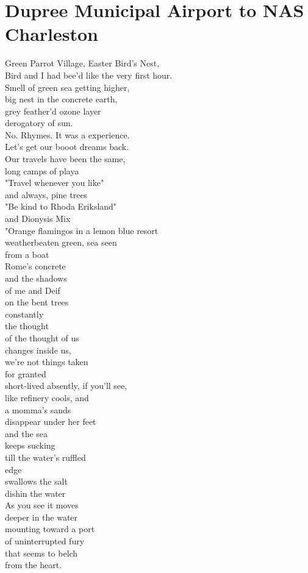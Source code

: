 \documentclass[smalldemyvopaper,11pt,twoside,onecolumn,openright,extrafontsizes]{memoir}
\begin{document}
\chapter{Dupree Municipal Airport to NAS Charleston}
Green Parrot Village, Easter Bird's Nest,
\\Bird and I had bee'd like the very first hour.
\\Smell of green sea getting higher,
\\big nest in the concrete earth,
\\grey feather'd ozone layer
\\derogatory of sun.
\\No. Rhymes. It was a experience.
\\Let's get our booot dreams back.
\\Our travels have been the same,
\\long camps of playa
\\"Travel whenever you like"
\\and always, pine trees
\\"Be kind to Rhoda Eriksland"
\\and Dionysis Mix
\\"Orange flamingos in a lemon blue resort
\\weatherbeaten green, sea seen
\\from a boat
\\Rome's concrete
\\and the shadows
\\of me and Deif
\\on the bent trees
\\constantly
\\the thought
\\of the thought of us
\\changes inside us,
\\we're not things taken
\\for granted
\\short-lived absently, if you'll see,
\\like refinery cools, and
\\a momma's sands
\\disappear under her feet
\\and the sea
\\keeps sucking
\\till the water's ruffled
\\edge
\\swallows the salt
\\dishin the water
\\As you see it moves
\\deeper in the water
\\mounting toward a port
\\of uninterrupted fury
\\that seems to belch
\\from the heart.
\end{document}
